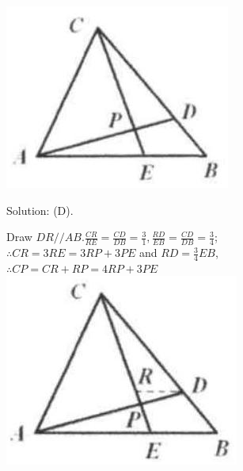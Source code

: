 \documentclass[10pt]{article}
\begin{document}
\includegraphics[max width=\textwidth, center]{2025_04_17_97bc1f7e44d93c271a88g-107(1)}

Solution: (D).


Draw \(D R / / A B . \frac{C R}{R E}=\frac{C D}{D B}=\frac{3}{1}, \frac{R D}{E B}=\frac{C D}{D B}=\frac{3}{4}\);\\
\(\therefore C R=3 R E=3 R P+3 P E\) and \(R D=\frac{3}{4} E B\),\\
\(\therefore C P=C R+R P=4 R P+3 P E\)\\
\includegraphics[max width=\textwidth, center]{2025_04_17_97bc1f7e44d93c271a88g-108(2)}
\end{document}
